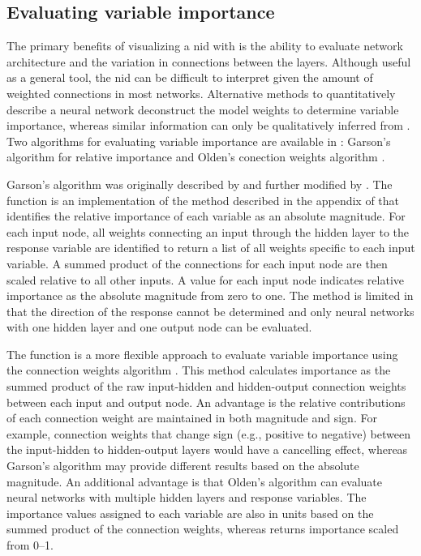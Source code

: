 \documentclass[article,shortnames]{jss}
\begin{document}
\subsection{Evaluating variable importance}

The primary benefits of visualizing a \ac{nid} with  is the ability to evaluate network architecture and the variation in connections between the layers.  Although useful as a general tool, the \ac{nid} can be difficult to interpret given the amount of weighted connections in most networks.  Alternative methods to quantitatively describe a neural network deconstruct the model weights to determine variable importance, whereas similar information can only be qualitatively inferred from .  Two algorithms for evaluating variable importance are available in : Garson's algorithm for relative importance \citep{Garson91,Goh95} and Olden's conection weights algorithm \citep{Olden04}.

Garson's algorithm was originally described by \citet{Garson91} and further modified by \citet{Goh95}.  The  function is an implementation of the method described in the appendix of \citet{Goh95} that identifies the relative importance of each variable as an absolute magnitude. For each input node, all weights connecting an input through the hidden layer to the response variable are identified to return a list of all weights specific to each input variable. A summed product of the connections for each input node are then scaled relative to all other inputs. A value for each input node indicates relative importance as the absolute magnitude from zero to one. The method is limited in that the direction of the response cannot be determined and only neural networks with one hidden layer and one output node can be evaluated.

The  function is a more flexible approach to evaluate variable importance using the connection weights algorithm \citep{Olden04}. This method calculates importance as the summed product of the raw input-hidden and hidden-output connection weights between each input and output node. An advantage is the relative contributions of each connection weight are maintained in both magnitude and sign. For example, connection weights that change sign (e.g., positive to negative) between the input-hidden to hidden-output layers would have a cancelling effect, whereas Garson's algorithm may provide different results based on the absolute magnitude. An additional advantage is that Olden's algorithm can evaluate neural networks with multiple hidden layers and response variables. The importance values assigned to each variable are also in units based on the summed product of the connection weights, whereas  returns importance scaled from 0--1.
\end{document}
